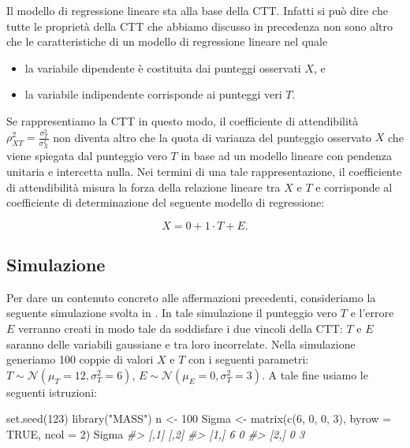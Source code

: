 \documentclass[
  11pt,
]{krantz}
\makeatletter
\newenvironment{Shaded}{\begin{snugshade}}{\end{snugshade}}
\newcommand{\AttributeTok}[1]{\textcolor[rgb]{0.61,0.61,0.61}{#1}}
\newcommand{\CommentTok}[1]{\textcolor[rgb]{0.37,0.37,0.37}{\textit{#1}}}
\newcommand{\ConstantTok}[1]{\textcolor[rgb]{0,0,0}{#1}}
\newcommand{\DecValTok}[1]{\textcolor[rgb]{0.06,0.06,0.06}{#1}}
\newcommand{\FunctionTok}[1]{\textcolor[rgb]{0,0,0}{#1}}
\newcommand{\NormalTok}[1]{#1}
\newcommand{\OtherTok}[1]{\textcolor[rgb]{0.37,0.37,0.37}{#1}}
\newcommand{\StringTok}[1]{\textcolor[rgb]{0.5,0.5,0.5}{#1}}
\providecommand{\tightlist}{%
  \setlength{\itemsep}{0pt}\setlength{\parskip}{0pt}}
\newenvironment{kframe}{%
\medskip{}
\setlength{\fboxsep}{.8em}
 \def\at@end@of@kframe{}%
 \ifinner\ifhmode%
  \def\at@end@of@kframe{\end{minipage}}%
  \begin{minipage}{\columnwidth}%
 \fi\fi%
 \def\FrameCommand##1{\hskip\@totalleftmargin \hskip-\fboxsep
 \colorbox{shadecolor}{##1}\hskip-\fboxsep
     \hskip-\linewidth \hskip-\@totalleftmargin \hskip\columnwidth}%
 \MakeFramed {\advance\hsize-\width
   \@totalleftmargin\z@ \linewidth\hsize
   \@setminipage}}%
 {\par\unskip\endMakeFramed%
 \at@end@of@kframe}
\renewenvironment{Shaded}{\begin{kframe}}{\end{kframe}}
\theoremstyle{definition}
\theoremstyle{definition}
\theoremstyle{definition}
\theoremstyle{definition}
\theoremstyle{remark}
\makeatother
\begin{document}
Il modello di regressione lineare sta alla base della CTT. Infatti si può dire che tutte le proprietà della CTT che abbiamo discusso in precedenza non sono altro che le caratteristiche di un modello di regressione lineare nel quale

\begin{itemize}
\tightlist
\item
  la variabile dipendente è costituita dai punteggi osservati \(X\), e
\item
  la variabile indipendente corrisponde ai punteggi veri \(T\).
\end{itemize}

Se rappresentiamo la CTT in questo modo, il coefficiente di attendibilità \(\rho_{XT}^2 = \frac{\sigma_{T}^2}{\sigma_X^2}\) non diventa altro che la quota di varianza del punteggio osservato \(X\) che viene spiegata dal punteggio vero \(T\) in base ad un modello lineare con pendenza unitaria e intercetta nulla. Nei termini di una tale rappresentazione, il coefficiente di attendibilità misura la forza della relazione lineare tra \(X\) e \(T\) e corrisponde al coefficiente di determinazione del seguente modello di regressione:

\[
X = 0 + 1 \cdot T + E.
\]

\hypertarget{simulazione}{%
\subsection{Simulazione}\label{simulazione}}

Per dare un contenuto concreto alle affermazioni precedenti, consideriamo la seguente simulazione svolta in . In tale simulazione il punteggio vero \(T\) e l'errore \(E\) verranno creati in modo tale da soddisfare i due vincoli della CTT: \(T\) e \(E\) saranno delle variabili gaussiane e tra loro incorrelate. Nella simulazione generiamo 100 coppie di valori \(X\) e \(T\) con i seguenti parametri: \(T \sim \mathcal{N}(\mu_T = 12, \sigma^2_T = 6)\), \(E \sim \mathcal{N}(\mu_E = 0, \sigma^2_T = 3)\). A tale fine usiamo le seguenti istruzioni:

\begin{Shaded}
\begin{Highlighting}[]
\FunctionTok{set.seed}\NormalTok{(}\DecValTok{123}\NormalTok{)}
\FunctionTok{library}\NormalTok{(}\StringTok{"MASS"}\NormalTok{)}
\NormalTok{n }\OtherTok{\textless{}{-}} \DecValTok{100}
\NormalTok{Sigma }\OtherTok{\textless{}{-}} \FunctionTok{matrix}\NormalTok{(}\FunctionTok{c}\NormalTok{(}\DecValTok{6}\NormalTok{, }\DecValTok{0}\NormalTok{, }\DecValTok{0}\NormalTok{, }\DecValTok{3}\NormalTok{), }\AttributeTok{byrow =} \ConstantTok{TRUE}\NormalTok{, }\AttributeTok{ncol =} \DecValTok{2}\NormalTok{)}
\NormalTok{Sigma}
\CommentTok{\#\textgreater{}      [,1] [,2]}
\CommentTok{\#\textgreater{} [1,]    6    0}
\CommentTok{\#\textgreater{} [2,]    0    3}
\end{Highlighting}
\end{Shaded}
\end{document}
